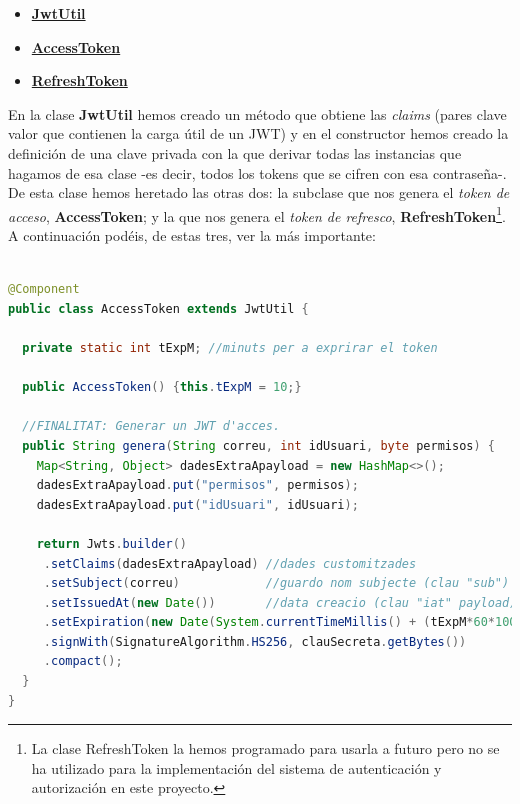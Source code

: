\documentclass[a4paper,12pt]{report}
\begin{document}
		\begin{itemize}
			\setlength{\itemsep}{-.4em}
			\item \href{https://github.com/blackcub3s/mercApp/blob/main/APP%20WEB/__springboot__produccio__/app/src/main/java/miApp/app/seguretat/jwt/JwtUtil.java}{\textbf{JwtUtil}}
			\item \href{https://github.com/blackcub3s/mercApp/blob/main/APP%20WEB/__springboot__produccio__/app/src/main/java/miApp/app/seguretat/jwt/AccessToken.java}{\textbf{AccessToken}}
			\item \href{https://github.com/blackcub3s/mercApp/blob/main/APP%20WEB/__springboot__produccio__/app/src/main/java/miApp/app/seguretat/jwt/RefreshToken.java}{\textbf{RefreshToken}}
		\end{itemize}
		  
		
		En la clase \textbf{JwtUtil} hemos creado un método que obtiene las \textit{claims} (pares clave valor que contienen la carga útil de un JWT) y en el constructor hemos creado la definición de una clave privada con la que derivar todas las instancias que hagamos de esa clase -es decir, todos los tokens que se cifren con esa contraseña-. De esta clase hemos heretado las otras dos: la subclase que nos genera el \textit{token de acceso}, \textbf{AccessToken}; y la que nos genera el \textit{token de refresco}, \textbf{RefreshToken}\footnote{La clase RefreshToken la hemos programado para usarla a futuro pero no se ha utilizado para la implementación del sistema de autenticación y autorización en este proyecto.}. A continuación podéis, de estas tres, ver la más importante: 
		
		

		
\begin{lstlisting}[language=Java, basicstyle=\ttfamily\footnotesize, keywordstyle=\color{magenta}]
				
@Component
public class AccessToken extends JwtUtil {
	
  private static int tExpM; //minuts per a exprirar el token
	
  public AccessToken() {this.tExpM = 10;}
	
  //FINALITAT: Generar un JWT d'acces.
  public String genera(String correu, int idUsuari, byte permisos) {
	Map<String, Object> dadesExtraApayload = new HashMap<>();
	dadesExtraApayload.put("permisos", permisos);
	dadesExtraApayload.put("idUsuari", idUsuari);
		
	return Jwts.builder()
	 .setClaims(dadesExtraApayload) //dades customitzades
	 .setSubject(correu)            //guardo nom subjecte (clau "sub")
	 .setIssuedAt(new Date())       //data creacio (clau "iat" payload)
	 .setExpiration(new Date(System.currentTimeMillis() + (tExpM*60*1000)))
	 .signWith(SignatureAlgorithm.HS256, clauSecreta.getBytes())
	 .compact();
  }
}


\end{lstlisting}
		
\end{document}
